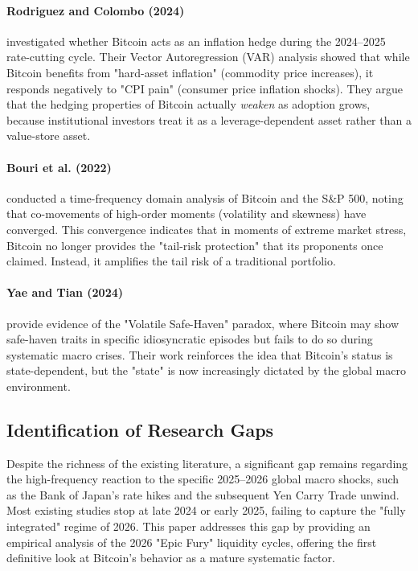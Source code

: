 \documentclass[10pt, conference, compsocconf]{IEEEtran}
\begin{document}
\paragraph{Rodriguez and Colombo (2024)} investigated whether Bitcoin acts as an inflation hedge during the 2024--2025 rate-cutting cycle. Their Vector Autoregression (VAR) analysis showed that while Bitcoin benefits from "hard-asset inflation" (commodity price increases), it responds negatively to "CPI pain" (consumer price inflation shocks). They argue that the hedging properties of Bitcoin actually \textit{weaken} as adoption grows, because institutional investors treat it as a leverage-dependent asset rather than a value-store asset.

\paragraph{Bouri et al. (2022)} conducted a time-frequency domain analysis of Bitcoin and the S\&P 500, noting that co-movements of high-order moments (volatility and skewness) have converged. This convergence indicates that in moments of extreme market stress, Bitcoin no longer provides the "tail-risk protection" that its proponents once claimed. Instead, it amplifies the tail risk of a traditional portfolio.

\paragraph{Yae and Tian (2024)} provide evidence of the "Volatile Safe-Haven" paradox, where Bitcoin may show safe-haven traits in specific idiosyncratic episodes but fails to do so during systematic macro crises. Their work reinforces the idea that Bitcoin's status is state-dependent, but the "state" is now increasingly dictated by the global macro environment.


\subsection{Identification of Research Gaps}

Despite the richness of the existing literature, a significant gap remains regarding the high-frequency reaction to the specific 2025--2026 global macro shocks, such as the Bank of Japan's rate hikes and the subsequent Yen Carry Trade unwind. Most existing studies stop at late 2024 or early 2025, failing to capture the "fully integrated" regime of 2026. This paper addresses this gap by providing an empirical analysis of the 2026 "Epic Fury" liquidity cycles, offering the first definitive look at Bitcoin’s behavior as a mature systematic factor.
\end{document}
